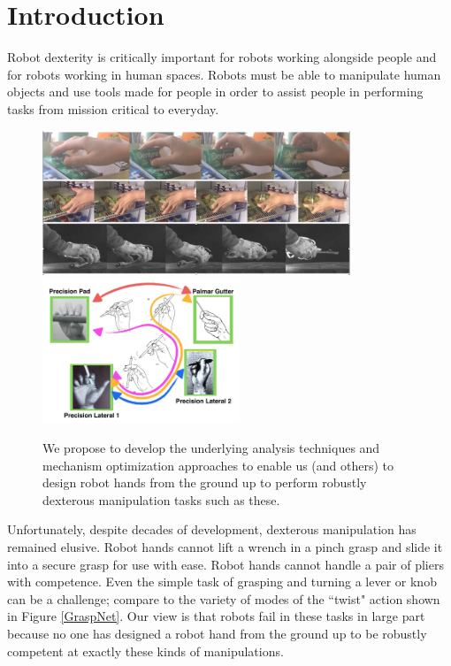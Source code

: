 \section{Introduction}

Robot dexterity is critically important for robots working alongside people and for robots working in human spaces.    Robots must be able to manipulate human objects and use tools made for people in order to assist people in performing tasks from mission critical to everyday.   

\begin{figure}
\begin{center}
{\includegraphics[height=1.7in]{./figs/acquireObject.png}}
{\includegraphics[height=1.7in]{./figs/smallGraspNet.png}}
\end{center}
\vspace*{-0.2in}
\caption[]{\small We propose to develop the underlying analysis techniques and mechanism optimization approaches to enable us (and others) to design  robot hands from the ground up to perform robustly dexterous manipulation tasks such as these.}
\label{DexterousExamples}
\end{figure}

Unfortunately, despite decades of development, dexterous manipulation has remained elusive.   Robot hands cannot lift a wrench in a pinch grasp and slide it into a secure grasp for use with ease.   Robot hands cannot handle a pair of pliers with competence.   Even the simple task of grasping and turning a lever or knob can be a challenge;   compare to the variety of modes of the ``twist" action shown in Figure \ref{GraspNet}.   Our view is that robots fail in these tasks in large part because no one has designed a robot hand from the ground up to be robustly competent at exactly these kinds of manipulations.

